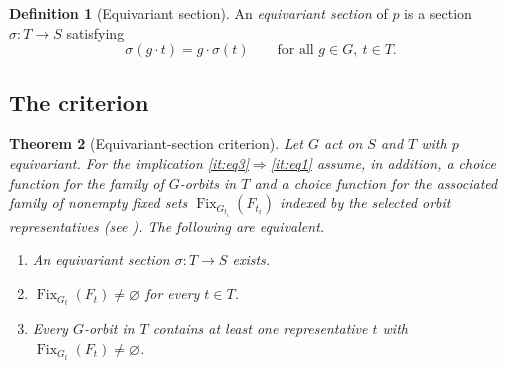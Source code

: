 \documentclass[11pt,reqno]{amsart}
\theoremstyle{plain}
\newtheorem{theorem}{Theorem}[section]
\theoremstyle{definition}
\newtheorem{definition}[theorem]{Definition}
\theoremstyle{remark}
\DeclareMathOperator{\Fix}{Fix}
\begin{document}
\begin{definition}[Equivariant section]
\label{def:equivsection}
An \emph{equivariant section} of $p$ is a section $\sigma\colon T\to S$ satisfying
\begin{equation}
\label{eq:equivsection}
\sigma(g\cdot t)=g\cdot\sigma(t)
\qquad\text{for all }g\in G,\ t\in T.
\end{equation}
\end{definition}

\subsection{The criterion}

\begin{theorem}[Equivariant-section criterion]
\label{thm:equivsection}
Let $G$ act on $S$ and $T$ with $p$ equivariant. For the implication \ref{it:eq3}$\Rightarrow$\ref{it:eq1} assume, in addition, a choice function for the family of $G$-orbits in $T$ \emph{and} a choice function for the associated family of nonempty fixed sets $\Fix_{G_{t_{i}}}(F_{t_{i}})$ indexed by the selected orbit representatives (see ). The following are equivalent.
\begin{enumerate}
\item\label{it:eq1} An equivariant section $\sigma\colon T\to S$ exists.
\item\label{it:eq2} $\Fix_{G_{t}}(F_{t})\neq\varnothing$ for every $t\in T$.
\item\label{it:eq3} Every $G$-orbit in $T$ contains at least one representative $t$ with $\Fix_{G_{t}}(F_{t})\neq\varnothing$.
\end{enumerate}
\end{theorem}
\end{document}
